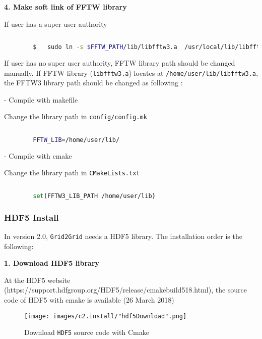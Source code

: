		
		\vspace{0.5cm}
		\textbf{4. Make soft link of FFTW library }
		
		If user has a super user authority
		
		\begin{lstlisting}[language=bash]
		
		$	sudo ln -s $FFTW_PATH/lib/libfftw3.a  /usr/local/lib/libfftw3.a		
		\end{lstlisting}
				
		\vspace{0.5cm}
		
		If user has no super user authority, FFTW library path should be changed manually. If FFTW library (\texttt{libfftw3.a}) locates at \texttt{/home/user/lib/libfftw3.a}, the FFTW3 library path should be changed as following : 
		
		- Compile with makefile
		
		Change the library path in \texttt{config/config.mk}
		
		\begin{lstlisting}[language=bash]
		
		FFTW_LIB=/home/user/lib/
		\end{lstlisting}

		- Compile with cmake		
		
		Change the library path in \texttt{CMakeLists.txt}		

		\begin{lstlisting}[language=bash]
		
		set(FFTW3_LIB_PATH /home/user/lib)
		\end{lstlisting}		
		
		\subsubsection{HDF5 Install}
		
		\label{chap:HDF5Install}
		
		In version 2.0, \texttt{Grid2Grid} needs a HDF5 library. The installation order is the following:
		
		\vspace{0.5cm}
		
		\textbf{1. Download HDF5 library}
		
		At the HDF5 website (https://support.hdfgroup.org/HDF5/release/cmakebuild518.html), the source code of HDF5 with cmake is available (26 March 2018)
		
		\vspace{0.5cm}
		{
			\begin{figure} [H]
				\centering
				\begin{tcolorbox}[standard jigsaw,opacityback=0]
					\texttt{[image: images/c2.install/"hdf5Download".png]}
				\end{tcolorbox}
				\vspace{0.3cm}
				\caption{Download \texttt{HDF5} source code with Cmake}			
				\label{fig:hdf5download}
			\end{figure}
		}
	
